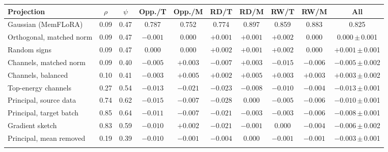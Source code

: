 \begin{tabular}{@{}l cc cccccc c@{}}
\toprule
Projection & $\rho$ & $\psi$ & Opp./T & Opp./M & RD/T & RD/M & RW/T & RW/M & All \\
\midrule
Gaussian (MemFLoRA) & 0.09 & 0.47 & 0.787 & 0.752 & 0.774 & 0.897 & 0.859 & 0.883 & 0.825 \\
\midrule
Orthogonal, matched norm & 0.09 & 0.47 & $-0.001$ & $0.000$ & $+0.001$ & $+0.001$ & $+0.002$ & $0.000$ & $0.000$\,{\scriptsize$\pm$\,0.001} \\
Random signs & 0.09 & 0.47 & $0.000$ & $0.000$ & $+0.002$ & $+0.001$ & $+0.002$ & $0.000$ & $+0.001$\,{\scriptsize$\pm$\,0.001} \\
Channels, matched norm & 0.09 & 0.40 & $-0.005$ & $+0.003$ & $-0.007$ & $+0.003$ & $-0.015$ & $-0.006$ & $-0.005$\,{\scriptsize$\pm$\,0.002} \\
Channels, balanced & 0.10 & 0.41 & $-0.003$ & $+0.005$ & $+0.002$ & $+0.005$ & $+0.003$ & $+0.003$ & $+0.003$\,{\scriptsize$\pm$\,0.002} \\
Top-energy channels & 0.27 & 0.54 & $-0.013$ & $-0.021$ & $-0.023$ & $-0.008$ & $-0.010$ & $-0.004$ & $-0.013$\,{\scriptsize$\pm$\,0.001} \\
Principal, source data & 0.74 & 0.62 & $-0.015$ & $-0.007$ & $-0.028$ & $0.000$ & $-0.005$ & $-0.006$ & $-0.010$\,{\scriptsize$\pm$\,0.001} \\
Principal, target batch & 0.85 & 0.64 & $-0.011$ & $-0.007$ & $-0.021$ & $-0.003$ & $-0.003$ & $-0.006$ & $-0.008$\,{\scriptsize$\pm$\,0.001} \\
Gradient sketch & 0.83 & 0.59 & $-0.010$ & $+0.002$ & $-0.021$ & $-0.001$ & $0.000$ & $-0.004$ & $-0.006$\,{\scriptsize$\pm$\,0.002} \\
Principal, mean removed & 0.19 & 0.39 & $-0.010$ & $-0.001$ & $-0.004$ & $0.000$ & $-0.001$ & $-0.001$ & $-0.003$\,{\scriptsize$\pm$\,0.001} \\
\botrule
\end{tabular}

